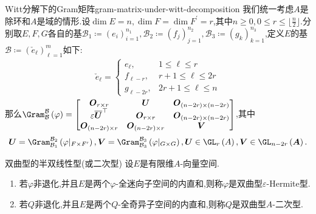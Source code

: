 \begin{remark}{Witt分解下的Gram矩阵}{gram-matrix-under-witt-decomposition}
	我们统一考虑$A$是除环和$A$是域的情形.设$\dim E=n,\dim F=\dim F^{\prime}=r$,其中$n\geq 0,0\leq r\leq\lfloor\frac{n}{2}\rfloor$.分别取$E,F,G$各自的基$\mathcal{B}_{1}\coloneq\left(e_{i}\right)_{i=1}^{n_{1}},\mathcal{B}_{2}\coloneq\left(f_{j}\right)_{j=1}^{n_{2}},\mathcal{B}_{3}\coloneq\left(g_{k}\right)_{k=1}^{n_{3}}$,定义$E$的基$\mathcal{B}\coloneq\left(\check{e}_{\ell}\right)_{\ell=1}^{m}$如下:
	\begin{align*}
		\check{e}_{\ell}=
		\begin{cases}
			e_{\ell},&1\leq\ell\leq r\\
			f_{\ell-r},&r+1\leq\ell\leq 2r\\
			g_{\ell-2r},&2r+1\leq\ell\leq n
		\end{cases}
	\end{align*}
	那么$\Gram_{\mathcal{B}}^{\mathcal{B}}\left(\varphi\right)=
	\begin{bmatrix}
		\boldsymbol{O}_{r\times r}&\boldsymbol{U}&\boldsymbol{O}_{\left(n-2r\right)\times\left(n-2r\right)}\\
		\varepsilon\overline{\boldsymbol{U}}^{\top}&\boldsymbol{O}_{r\times r}&\boldsymbol{O}_{\left(n-2r\right)\times\left(n-2r\right)}\\
		\boldsymbol{O}_{\left(n-2r\right)\times r}&\boldsymbol{O}_{\left(n-2r\right)\times r}&\boldsymbol{V}
	\end{bmatrix}
	$,其中
	\begin{align*}
		\boldsymbol{U}=\Gram_{\mathcal{B}_{1}}^{\mathcal{B}_{2}}\left(\varphi|_{F\times F^{\prime}}\right),\boldsymbol{V}=\Gram_{\mathcal{B}_{3}}^{\mathcal{B}_{3}}\left(\varphi|_{G\times G}\right),\boldsymbol{U}\in\GL_{r}\left(A\right),\boldsymbol{V}\in\GL_{n-2r}\left(\boldsymbol{A}\right).
	\end{align*}
\end{remark}

\begin{definition}{双曲型的半双线性型(或二次型)}{}
	设$E$是有限维$A$-向量空间.
	\begin{enumerate}
		\item 若$\varphi$非退化,并且$E$是两个$\varphi$-全迷向子空间的内直和,则称$\varphi$是双曲型$\varepsilon$-Hermite型.
		\item 若$Q$非退化,并且$E$是两个$Q$-全奇异子空间的内直和,则称$Q$是双曲型$A$-二次型.
	\end{enumerate}
\end{definition}

